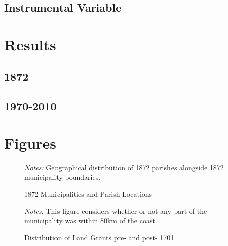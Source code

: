 \documentclass{article}
\begin{document}
\subsection{Instrumental Variable}

\section{Results}

\subsection{1872}

\subsection{1970-2010}

\clearpage



\printbibliography

\clearpage

\section*{Figures}

\begin{figure}[h!]
  \caption{1872 Municipalities and Parish Locations}
  \begin{center}
  \textit{Notes:} Geographical distribution of 1872 parishes alongside 1872 municipality boundaries.
  \end{center}
  \label{fig:parishes_1872}
\end{figure}

\begin{figure}
  \caption{Distribution of Land Grants pre- and post- 1701}
  \begin{center}
  \textit{Notes:} This figure considers whether or not any part of the municipality was within 80km of the coast.
  \end{center}
  \label{fig:SesmariasDistribution}
\end{figure}
\end{document}
